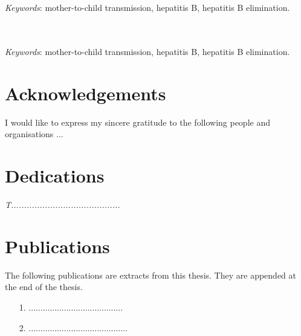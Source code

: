 \begin{abstract}[english]%
\textit{the abstract goes here}
\end{abstract}
\\\\
\textit{Keywords}:  mother-to-child transmission,  hepatitis B, hepatitis B elimination.



\begin{abstract}%
.........................................................................
\end{abstract}
\\\\
\textit{Keywords}: mother-to-child transmission,  hepatitis B, hepatitis B elimination.



\chapter*{Acknowledgements}%


I would like to express my sincere gratitude to the following people
and organisations ...


\chapter*{Dedications}%
 \vspace{6cm}
 \begin{center}\itshape
T..........................................
 \end{center}
\vfill
 \clearpage
\chapter{Publications}%

The following publications are extracts from this thesis. They are appended at the
end of the thesis.
\begin{itemize}
\item[1.] ........................................
\item[2.] ..........................................
\end{itemize}


\endinput
